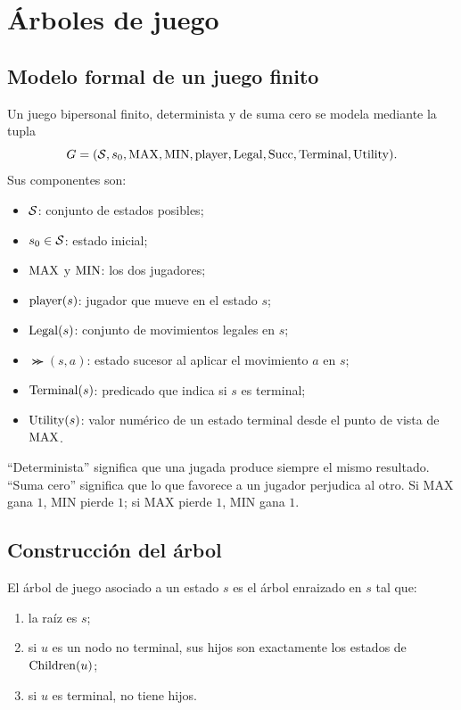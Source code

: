 \chapter{Árboles de juego}

\section{Modelo formal de un juego finito}

\begin{definition}
Un juego bipersonal finito, determinista y de suma cero se modela mediante la tupla
\[
G=(\mathcal{S},s_0,\mathrm{MAX},\mathrm{MIN},\operatorname{player},\operatorname{Legal},\operatorname{Succ},\operatorname{Terminal},\operatorname{Utility}).
\]
Sus componentes son:
\begin{itemize}
\item $\mathcal{S}$: conjunto de estados posibles;
\item $s_0\in\mathcal{S}$: estado inicial;
\item $\mathrm{MAX}$ y $\mathrm{MIN}$: los dos jugadores;
\item $\operatorname{player}(s)$: jugador que mueve en el estado $s$;
\item $\operatorname{Legal}(s)$: conjunto de movimientos legales en $s$;
\item $\Succ(s,a)$: estado sucesor al aplicar el movimiento $a$ en $s$;
\item $\operatorname{Terminal}(s)$: predicado que indica si $s$ es terminal;
\item $\operatorname{Utility}(s)$: valor numérico de un estado terminal desde el punto de vista de $\mathrm{MAX}$.
\end{itemize}
\end{definition}

\begin{intuitionbox}
``Determinista'' significa que una jugada produce siempre el mismo resultado. ``Suma cero'' significa que lo que favorece a un jugador perjudica al otro. Si MAX gana $1$, MIN pierde $1$; si MAX pierde $1$, MIN gana $1$.
\end{intuitionbox}

\section{Construcción del árbol}

\begin{definition}
El árbol de juego asociado a un estado $s$ es el árbol enraizado en $s$ tal que:
\begin{enumerate}
\item la raíz es $s$;
\item si $u$ es un nodo no terminal, sus hijos son exactamente los estados de $\operatorname{Children}(u)$;
\item si $u$ es terminal, no tiene hijos.
\end{enumerate}
\end{definition}

